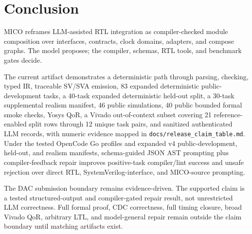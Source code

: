\section{Conclusion}

MICO reframes LLM-assisted RTL integration as compiler-checked module composition over interfaces, contracts, clock domains, adapters, and compose graphs. The model proposes; the compiler, schemas, RTL tools, and benchmark gates decide.

The current artifact demonstrates a deterministic path through parsing, checking, typed IR, traceable SV/SVA emission, 83 expanded deterministic public-development tasks, a 40-task expanded deterministic held-out split, a 30-task supplemental realism manifest, 46 public simulations, 40 public bounded formal smoke checks, Yosys QoR, a Vivado out-of-context subset covering 21 reference-enabled split rows through 12 unique task pairs, and sanitized authenticated LLM records, with numeric evidence mapped in \texttt{docs/release\_claim\_table.md}. Under the tested OpenCode Go profiles and expanded v4 public-development, held-out, and realism manifests, schema-guided JSON AST prompting plus compiler-feedback repair improves positive-task compiler/lint success and unsafe rejection over direct RTL, SystemVerilog-interface, and MICO-source prompting.

The DAC submission boundary remains evidence-driven. The supported claim is a
tested structured-output and compiler-gated repair result, not unrestricted LLM
correctness. Full formal proof, CDC correctness, full timing closure, broad
Vivado QoR, arbitrary LTL, and model-general repair remain outside the claim
boundary until matching artifacts exist.
